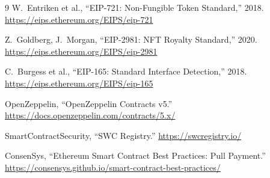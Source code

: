 \documentclass[12pt,a4paper,oneside]{report}
\theoremstyle{plain}
\theoremstyle{definition}
\theoremstyle{remark}
\begin{document}
\begin{thebibliography}{9}
  W.~Entriken et al.,
  ``EIP-721: Non-Fungible Token Standard,'' 2018.
  \url{https://eips.ethereum.org/EIPS/eip-721}

  Z.~Goldberg, J.~Morgan,
  ``EIP-2981: NFT Royalty Standard,'' 2020.
  \url{https://eips.ethereum.org/EIPS/eip-2981}

  C.~Burgess et al.,
  ``EIP-165: Standard Interface Detection,'' 2018.
  \url{https://eips.ethereum.org/EIPS/eip-165}

  OpenZeppelin,
  ``OpenZeppelin Contracts v5.''
  \url{https://docs.openzeppelin.com/contracts/5.x/}

  SmartContractSecurity,
  ``SWC Registry.''
  \url{https://swcregistry.io/}

  ConsenSys,
  ``Ethereum Smart Contract Best Practices: Pull Payment.''
  \url{https://consensys.github.io/smart-contract-best-practices/}
\end{thebibliography}
\end{document}
